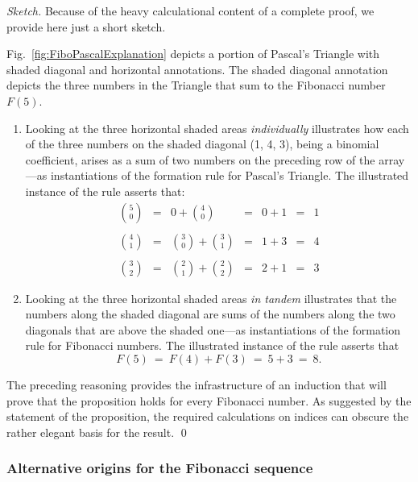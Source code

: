 \begin{proof}[Sketch]
Because of the heavy calculational content of a complete proof, we
provide here just a short sketch.

Fig.~\ref{fig:FiboPascalExplanation} depicts a portion of Pascal's
Triangle with shaded diagonal and horizontal annotations.  The shaded
diagonal annotation depicts the three numbers in the Triangle that
sum to the Fibonacci number $F(5)$.
\begin{enumerate}
\item
Looking at the three horizontal shaded areas {\em individually}
illustrates how each of the three numbers on the shaded diagonal (1, 4, 3),
being a binomial coefficient, arises as a sum of two numbers on the
preceding row of the array---as instantiations of the formation rule
for Pascal's Triangle.  The illustrated instance of the rule asserts
that:
\[
\begin{array}{ccccccc}
{\displaystyle {5 \choose 0}}
 & = &
{\displaystyle 0 + {4 \choose 0} }
 & = &
0 + 1
 & = & 1 \\ \\
{\displaystyle {4 \choose 1}}
 & = &
{\displaystyle {3 \choose 0} + {3 \choose 1} }
 & = &
1 + 3
 & = & 4 \\ \\
{\displaystyle {3 \choose 2}}
 & = &
{\displaystyle {2 \choose 1} + {2 \choose 2} }
 & = &
2 + 1
 & = & 3
\end{array}
\]
\item
Looking at the three horizontal shaded areas {\em in tandem}
illustrates that the numbers along the shaded diagonal are sums of the
numbers along the two diagonals that are above the shaded one---as
instantiations of the formation rule for Fibonacci numbers.  The
illustrated instance of the rule asserts that
\[ F(5) \ = \ F(4) + F(3) \ = \ 5 + 3 \ = \ 8. \]
\end{enumerate}

The preceding reasoning provides the infrastructure of an induction
that will prove that the proposition holds for every Fibonacci
number.  As suggested by the statement of the proposition, the
required calculations on indices can obscure the rather elegant basis
for the result.
\qed
\end{proof}



\subsubsection{Alternative origins for the Fibonacci sequence}
\label{sec:Fibonacci-other-recurrences}

